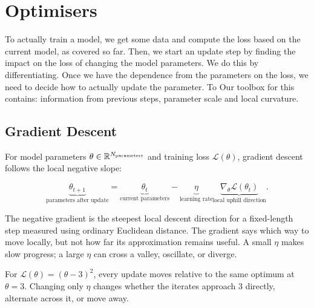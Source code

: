 \chapter{Optimisers}
\label{chap:optimisation}
To actually train a model, we get some data and compute the loss based on the current model, as covered so far.
Then, we start an update step by finding the impact on the loss of changing the model parameters.
We do this by differentiating.
Once we have the dependence from the parameters on the loss, we need to decide how to actually update the parameter. 
To Our toolbox for this contains: information from previous steps, parameter scale and local curvature.

\section{Gradient Descent}

\label{sec:optimisation-gradient-descent-following-the-slope-downhill}
For model parameters $\theta\in\mathbb R^{N_{\text{parameters}}}$ and training loss $\mathcal L(\theta)$, gradient descent follows the local negative slope:
\begin{calloutmemorise}
\[
    \underbrace{\theta_{t+1}}_{\text{parameters after update}}
    =
    \underbrace{\theta_t}_{\text{current parameters}}
    -
    \underbrace{\eta}_{\text{learning rate}}
    \underbrace{\nabla_\theta\mathcal L(\theta_t)}_{\text{local uphill direction}}.
\]
\end{calloutmemorise}
The negative gradient is the steepest local descent direction for a fixed-length step measured using ordinary Euclidean distance.
The gradient says which way to move locally, but not how far its approximation remains useful.
A small $\eta$ makes slow progress; a large $\eta$ can cross a valley, oscillate, or diverge.

\begin{calloutexample}
    For $\mathcal L(\theta)=(\theta-3)^2$, every update moves relative to the same optimum at $\theta=3$.
    Changing only $\eta$ changes whether the iterates approach $3$ directly, alternate across it, or move away.
\end{calloutexample}


